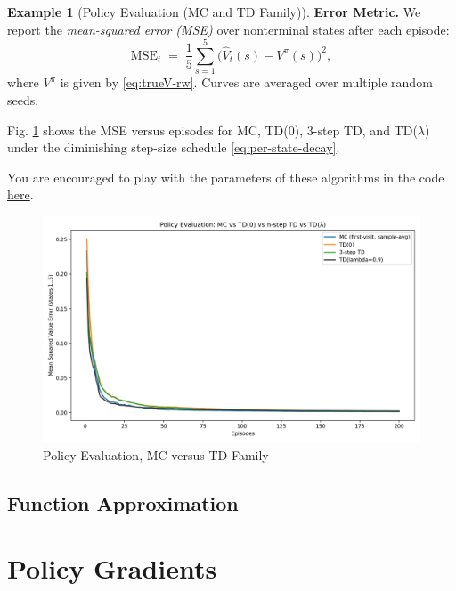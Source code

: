 \documentclass[
]{book}
\theoremstyle{definition}
\theoremstyle{definition}
\newtheorem{example}{Example}[chapter]
\theoremstyle{definition}
\theoremstyle{definition}
\theoremstyle{remark}
\begin{document}
\begin{example}[Policy Evaluation (MC and TD Family)]
\textbf{Error Metric.}
We report the \emph{mean-squared error (MSE)} over nonterminal states after each episode:
\begin{equation}
\mathrm{MSE}_t \;=\; \frac{1}{5}\sum_{s=1}^{5}\big(\hat V_t(s)-V^\pi(s)\big)^2,
\label{eq:mse-metric}
\end{equation}
where \(V^\pi\) is given by \eqref{eq:trueV-rw}. Curves are averaged over multiple random seeds.

Fig. \ref{fig:policy-evaluation-random-walk} shows the MSE versus episodes for MC, TD(0), 3-step TD, and TD(\(\lambda\)) under the diminishing step-size schedule \eqref{eq:per-state-decay}.

You are encouraged to play with the parameters of these algorithms in the code \href{https://github.com/ComputationalRobotics/2025-ES-AM-158-LECTURE-CODE/blob/main/policy_evaluation_mc_td.py}{here}.

\begin{figure}

{\centering \includegraphics[width=0.9\linewidth]{images/Value-RL/mc_td_comparison} 

}

\caption{Policy Evaluation, MC versus TD Family}\label{fig:policy-evaluation-random-walk}
\end{figure}

\end{example}

\section{Function Approximation}\label{function-approximation}

\chapter{Policy Gradients}\label{policy-gradient}
\end{document}
